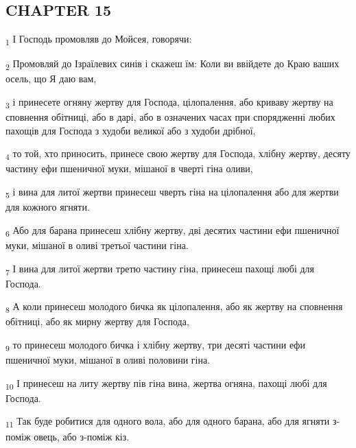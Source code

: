 \subsection{CHAPTER 15}
\begin{tcolorbox}
\textsubscript{1} І Господь промовляв до Мойсея, говорячи:
\end{tcolorbox}
\begin{tcolorbox}
\textsubscript{2} Промовляй до Ізраїлевих синів і скажеш їм: Коли ви ввійдете до Краю ваших осель, що Я даю вам,
\end{tcolorbox}
\begin{tcolorbox}
\textsubscript{3} і принесете огняну жертву для Господа, цілопалення, або криваву жертву на сповнення обітниці, або в дарі, або в означених часах при спорядженні любих пахощів для Господа з худоби великої або з худоби дрібної,
\end{tcolorbox}
\begin{tcolorbox}
\textsubscript{4} то той, хто приносить, принесе свою жертву для Господа, хлібну жертву, десяту частину ефи пшеничної муки, мішаної в чверті гіна оливи,
\end{tcolorbox}
\begin{tcolorbox}
\textsubscript{5} і вина для литої жертви принесеш чверть гіна на цілопалення або для жертви для кожного ягняти.
\end{tcolorbox}
\begin{tcolorbox}
\textsubscript{6} Або для барана принесеш хлібну жертву, дві десятих частини ефи пшеничної муки, мішаної в оливі третьої частини гіна.
\end{tcolorbox}
\begin{tcolorbox}
\textsubscript{7} І вина для литої жертви третю частину гіна, принесеш пахощі любі для Господа.
\end{tcolorbox}
\begin{tcolorbox}
\textsubscript{8} А коли принесеш молодого бичка як цілопалення, або як жертву на сповнення обітниці, або як мирну жертву для Господа,
\end{tcolorbox}
\begin{tcolorbox}
\textsubscript{9} то принесеш молодого бичка і хлібну жертву, три десяті частини ефи пшеничної муки, мішаної в оливі половини гіна.
\end{tcolorbox}
\begin{tcolorbox}
\textsubscript{10} І принесеш на литу жертву пів гіна вина, жертва огняна, пахощі любі для Господа.
\end{tcolorbox}
\begin{tcolorbox}
\textsubscript{11} Так буде робитися для одного вола, або для одного барана, або для ягняти з-поміж овець, або з-поміж кіз.
\end{tcolorbox}
